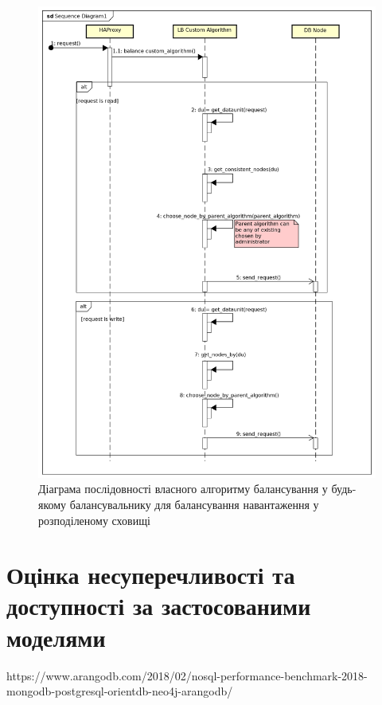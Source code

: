 \documentclass[14pt]{vakthesis}
\begin{document}
\begin{figure}
\centering

\includegraphics[width=\linewidth]{images/sequence_diagram_lb_custom_algorithm.png}
     \caption{Діаграма 	послідовності власного алгоритму балансування у будь-якому балансувальнику для балансування навантаження у розподіленому сховищі}
     \label{fig:d_sequence_lb_custom_algorithm}
\end{figure}


\section{Оцінка несуперечливості та доступності за застосованими моделями} \label{efficiency_estimates}
https://www.arangodb.com/2018/02/nosql-performance-benchmark-2018-mongodb-postgresql-orientdb-neo4j-arangodb/
\end{document}
